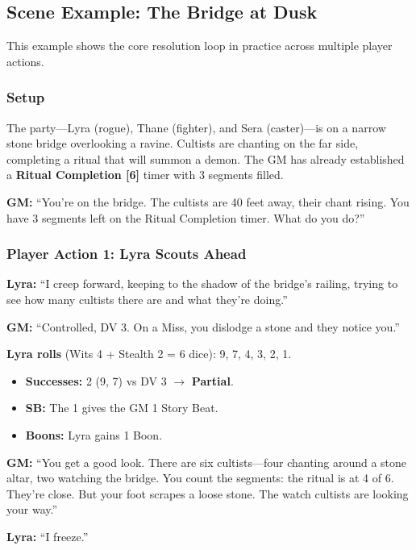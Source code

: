 \subsection{Scene Example: The Bridge at Dusk}

This example shows the core resolution loop in practice across multiple player actions.

\subsubsection{Setup}

The party---Lyra (rogue), Thane (fighter), and Sera (caster)---is on a narrow stone bridge overlooking a ravine. Cultists are chanting on the far side, completing a ritual that will summon a demon. The GM has already established a \textbf{Ritual Completion [6]} timer with 3 segments filled.

\textbf{GM:} ``You're on the bridge. The cultists are 40 feet away, their chant rising. You have 3 segments left on the Ritual Completion timer. What do you do?''

\subsubsection{Player Action 1: Lyra Scouts Ahead}

\textbf{Lyra:} ``I creep forward, keeping to the shadow of the bridge's railing, trying to see how many cultists there are and what they're doing.''

\textbf{GM:} ``Controlled, DV 3. On a Miss, you dislodge a stone and they notice you.''

\textbf{Lyra rolls} (Wits 4 + Stealth 2 = 6 dice): 9, 7, 4, 3, 2, 1.

\begin{itemize}
  \item \textbf{Successes:} 2 (9, 7) vs DV 3 $\rightarrow$ \textbf{Partial}.
  \item \textbf{SB:} The 1 gives the GM 1 Story Beat.
  \item \textbf{Boons:} Lyra gains 1 Boon.
\end{itemize}

\textbf{GM:} ``You get a good look. There are six cultists---four chanting around a stone altar, two watching the bridge. You count the segments: the ritual is at 4 of 6. They're close. But your foot scrapes a loose stone. The watch cultists are looking your way.''

\textbf{Lyra:} ``I freeze.''

